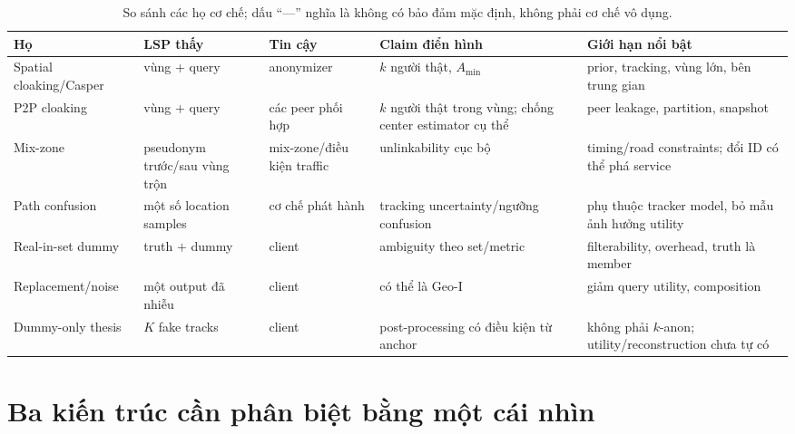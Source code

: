 \documentclass[11pt,a4paper,oneside]{report}
\begin{document}
\begin{table}[htbp]
\centering
\scriptsize
\caption{So sánh các họ cơ chế; dấu ``---'' nghĩa là không có bảo đảm mặc định, không phải cơ chế vô dụng.}
\label{tab:family-comparison}
\begin{tabularx}{\textwidth}{P{2.25cm}P{2.2cm}P{2.3cm}P{2.45cm}Y}
\toprule
\textbf{Họ} & \textbf{LSP thấy} & \textbf{Tin cậy} & \textbf{Claim điển hình} & \textbf{Giới hạn nổi bật}\\
\midrule
Spatial cloaking/Casper & vùng + query & anonymizer & $k$ người thật, $A_{\min}$ & prior, tracking, vùng lớn, bên trung gian\\
P2P cloaking & vùng + query & các peer phối hợp & $k$ người thật trong vùng; chống center estimator cụ thể & peer leakage, partition, snapshot\\
Mix-zone & pseudonym trước/sau vùng trộn & mix-zone/điều kiện traffic & unlinkability cục bộ & timing/road constraints; đổi ID có thể phá service\\
Path confusion & một số location samples & cơ chế phát hành & tracking uncertainty/ngưỡng confusion & phụ thuộc tracker model, bỏ mẫu ảnh hưởng utility\\
Real-in-set dummy & truth $+$ dummy & client & ambiguity theo set/metric & filterability, overhead, truth là member\\
Replacement/noise & một output đã nhiễu & client & có thể là Geo-I & giảm query utility, composition\\
Dummy-only thesis & $K$ fake tracks & client & post-processing có điều kiện từ anchor & không phải $k$-anon; utility/reconstruction chưa tự có\\
\bottomrule
\end{tabularx}
\end{table}

\section{Ba kiến trúc cần phân biệt bằng một cái nhìn}
\end{document}
